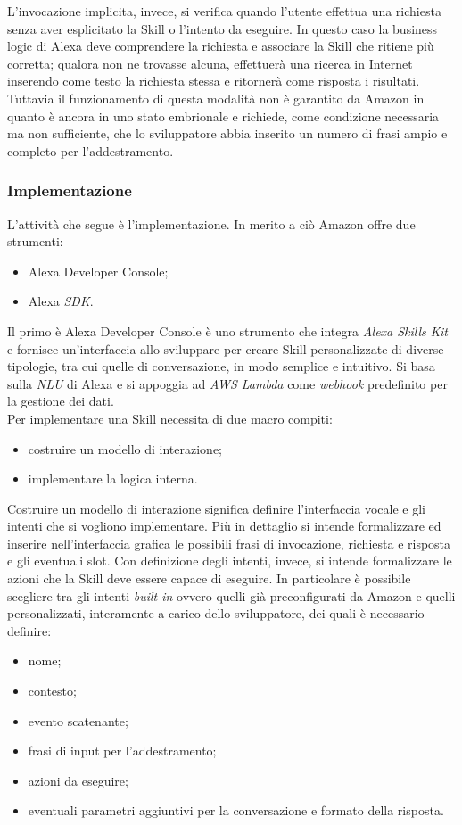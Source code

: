 		L'invocazione implicita, invece, si verifica quando l'utente effettua una richiesta senza aver esplicitato la Skill o l'intento da eseguire. In questo caso la business logic di Alexa deve comprendere la richiesta e associare la Skill che ritiene più corretta; qualora non ne trovasse alcuna, effettuerà una ricerca in Internet inserendo come testo la richiesta stessa e ritornerà come risposta i risultati. Tuttavia il funzionamento di questa modalità non è garantito da Amazon in quanto è ancora in uno stato embrionale e richiede, come condizione necessaria ma non sufficiente, che lo sviluppatore abbia inserito un numero di frasi ampio e completo per l'addestramento.
		\subsubsection{Implementazione}
		L'attività che segue è l'implementazione. In merito a ciò Amazon offre due strumenti:
		\begin{itemize}
			\item Alexa Developer Console;
			\item Alexa \textit{SDK}.
		\end{itemize}
		Il primo è Alexa Developer Console è uno strumento che integra \textit{Alexa Skills Kit} e fornisce un'interfaccia allo sviluppare per creare Skill personalizzate di diverse tipologie, tra cui quelle di conversazione, in modo semplice e intuitivo. Si basa sulla \textit{NLU} di Alexa e si appoggia ad \textit{AWS Lambda} come \textit{webhook} predefinito per la gestione dei dati. \\
		Per implementare una Skill necessita di due macro compiti:
		\begin{itemize}
			\item costruire un modello di interazione;
			\item implementare la logica interna.
		\end{itemize}
		Costruire un modello di interazione significa definire l'interfaccia vocale e gli intenti che si vogliono implementare. Più in dettaglio si intende formalizzare ed inserire nell'interfaccia grafica le possibili frasi di invocazione, richiesta e risposta e gli eventuali slot. Con definizione degli intenti, invece, si intende formalizzare le azioni che la Skill deve essere capace di eseguire. In particolare è possibile scegliere tra gli intenti \textit{built-in} ovvero quelli già preconfigurati da Amazon e quelli personalizzati, interamente a carico dello sviluppatore, dei quali è necessario definire:
		\begin{itemize}
			\item nome;
			\item contesto;
			\item evento scatenante;
			\item frasi di input per l'addestramento;
			\item azioni da eseguire;
			\item eventuali parametri aggiuntivi per la conversazione e formato della risposta.
		\end{itemize}
